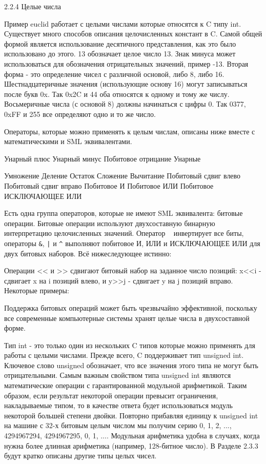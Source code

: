 2.2.4 Целые числа

Пример euclid работает с целыми числами которые относятся к C типу int. Существует много способов описания целочисленных констант в C. Самой общей формой является использование десятичного представления, как это было использовано до этого. 13 обозначает целое число 13. Знак минуса может использоваться для обозначения отрицательных значений, пример -13. Вторая форма - это определение чисел с различной основой, либо 8, либо 16. Шестнадцатеричные значения (использующие основу 16) могут записываться после букв 0x. Так 0x2C и 44 оба относятся к одному и тому же числу. Восьмеричные числа (с основой 8) должны начинаться с цифры 0. Так 0377, 0xFF и 255 все определяют одно и то же число.

Операторы, которые можно применять к целым числам, описаны ниже вместе с математическими и SML эквивалентами.

Унарный плюс
Унарный минус
Побитовое отрицание
Унарные

Умножение
Деление
Остаток
Сложение
Вычитание
Побитовый сдвиг влево
Побитовый сдвиг вправо
Побитовое И
Побитовое ИЛИ
Побитовое ИСКЛЮЧАЮЩЕЕ ИЛИ

Есть одна группа операторов, которые не имеют SML эквивалента: битовые операции. Битовые операции используют двухсоставную бинарную интерпретацию целочисленных значений. Оператор ~ инвертирует все биты, операторы \lstinline|&|, \lstinline!|! и \lstinline|^| выполняют побитовое И, ИЛИ и ИСКЛЮЧАЮЩЕЕ ИЛИ для двух битовых наборов. Всё нижеследующее истинно:

Операции << и >> сдвигают битовый набор на заданное число позиций: x<<i - сдвигает x на i позиций влево, и y>>j - сдвигает y на j позиций вправо. Некоторые примеры:

Поддержка битовых операций может быть чрезвычайно эффективной, поскольку все современные компьютерные системы хранят целые числа в двухсоставной форме.

Тип int - это только один из нескольких C типов которые можно применять для работы с целыми числами. Прежде всего, C поддерживает тип unsigned int. Ключевое слово unsigned обозначает, что все значения этого типа не могут быть отрицательными. Самым важным свойством типа unsigned int являются математические операции с гарантированной модульной арифметикой. Таким образом, если результат некоторой операции превысит ограничения, накладываемые типом, то в качестве ответа будет использоваться модуль некоторой большей степени двойки. Повторно прибавляя единицу к unsigned int на машине с 32-х битовым целым числом мы получим серию 0, 1, 2, ..., 4294967294, 4294967295, 0, 1, .... Модульная арифметика удобна в случаях, когда нужна более длинная арифметика (например, 128-битное число). В Разделе 2.3.3 будут кратко описаны другие типы целых чисел.

